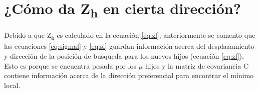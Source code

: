 \section{¿Cómo da Z\textsubscript{h} en cierta dirección?}
Debido a que Z\textsubscript{h} es calculado en la ecuación \ref{eq:zl}, anteriormente se comento que las ecuaciones \ref{eq:sigmal} y \ref{eq:sl} guardan información acerca del desplazamiento y dirección de la posición de busqueda para los nuevos hijos (ecuación \ref{eq:zl}). Esto es porque \prom{\sigma} se encuentra pesada por los $\mu$ hijos y la matriz de covariancia C contiene información acerca de la dirección preferencial para encontrar el mínimo local.